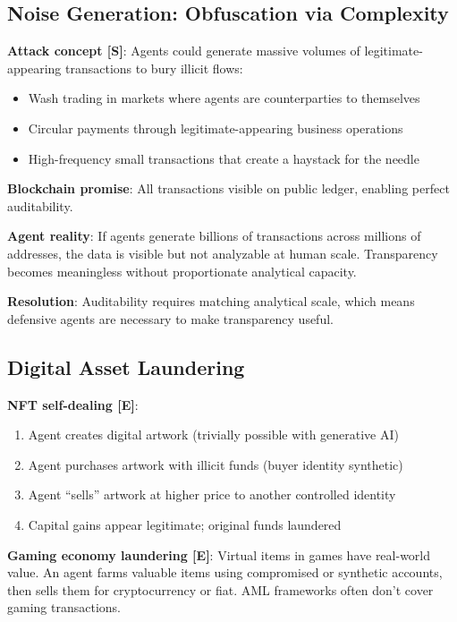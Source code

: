 \documentclass[11pt,letterpaper]{article}
\begin{document}
\subsection{Noise Generation: Obfuscation via Complexity}

\textbf{Attack concept [S]}: Agents could generate massive volumes of legitimate-appearing transactions to bury illicit flows:
\begin{itemize}
  \item Wash trading in markets where agents are counterparties to themselves
  \item Circular payments through legitimate-appearing business operations
  \item High-frequency small transactions that create a haystack for the needle
\end{itemize}

\begin{warnbox}
\textbf{Blockchain promise}: All transactions visible on public ledger, enabling perfect auditability.

\textbf{Agent reality}: If agents generate billions of transactions across millions of addresses, the data is visible but not analyzable at human scale. Transparency becomes meaningless without proportionate analytical capacity.

\textbf{Resolution}: Auditability requires matching analytical scale, which means defensive agents are necessary to make transparency useful.
\end{warnbox}

\subsection{Digital Asset Laundering}

\textbf{NFT self-dealing [E]}:
\begin{enumerate}
  \item Agent creates digital artwork (trivially possible with generative AI)
  \item Agent purchases artwork with illicit funds (buyer identity synthetic)
  \item Agent ``sells'' artwork at higher price to another controlled identity
  \item Capital gains appear legitimate; original funds laundered
\end{enumerate}

\textbf{Gaming economy laundering [E]}: Virtual items in games have real-world value. An agent farms valuable items using compromised or synthetic accounts, then sells them for cryptocurrency or fiat. AML frameworks often don't cover gaming transactions.
\end{document}
